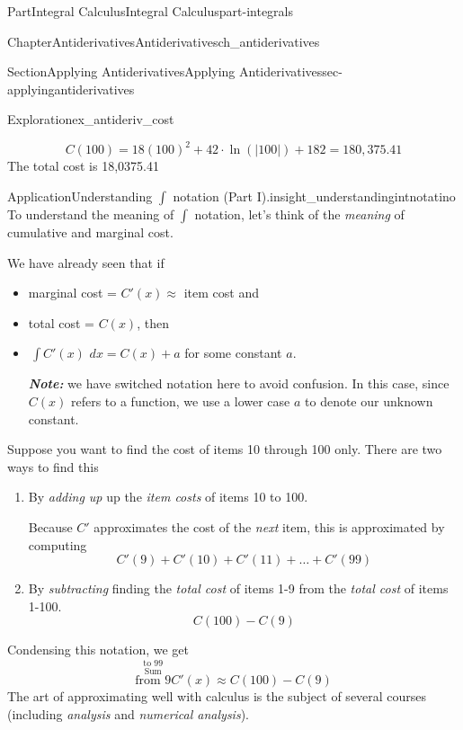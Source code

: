 \documentclass{tufte-book}
\newcommand{\alert}[1]{\textbf{\textit{#1}}}
\numberwithin{equation}{chapter}
\newcommand{\intdx}[1]{{\,\int#1\,\,dx}}
\begin{document}
\begin{partptx}{Part}{Integral Calculus}{}{Integral Calculus}{}{}{part-integrals}
\begin{chapterptx}{Chapter}{Antiderivatives}{}{Antiderivatives}{}{}{ch_antiderivatives}
\begin{sectionptx}{Section}{Applying Antiderivatives}{}{Applying Antiderivatives}{}{}{sec-applyingantiderivatives}
\begin{exploration}{Exploration}{}{ex_antideriv_cost}
\begin{enumerate}[font=\bfseries,label=(\alph*),ref=\alph*]
\begin{equation*}
C(100) = 18 (100)^2 + 42\cdot \ln(|100|) + 182 = 180,375.41
\end{equation*}
The total cost is \textdollar{}18,0375.41%
\end{enumerate}%
\end{exploration}%
\begin{insight}{Application}{Understanding \(\int\) notation (Part I).}{insight_understandingintnotatino}%
To understand the meaning of \(\int\) notation, let's think of the \emph{meaning} of cumulative and marginal cost.%
\par
We have already seen that if%
\begin{itemize}[label=\textbullet]
\item{}marginal cost = \(C'(x) \approx\) item cost and%
\item{}total cost = \(C(x)\), then%
\item{}\(\intdx{C'(x)} = C(x) + a\) for some constant \(a\).%
\par
\alert{Note:} we have switched notation here to avoid confusion. In this case, since \(C(x)\) refers to a function, we use a lower case \(a\) to denote our unknown constant.%
\end{itemize}
%
\par
Suppose you want to find the cost of items 10 through 100 only.  There are two ways to find this%
\begin{enumerate}
\item{}By \emph{adding up} up the \emph{item costs} of items 10 to 100.%
\par
Because \(C'\) approximates the cost of the \emph{next} item, this is approximated by computing%
\begin{equation*}
C'(9)+C'(10)+C'(11) + \dots + C'(99) 
\end{equation*}
%
\item{}By \emph{subtracting} finding the \emph{total cost} of items 1-9 from the \emph{total cost} of items 1-100.%
\begin{equation*}
C(100) - C(9)
\end{equation*}
%
\end{enumerate}
Condensing this notation, we get%
\begin{equation*}
\stackrel{ \scriptstyle \text{to 99} }{ \stackrel{\textstyle\text{Sum}}{ \scriptstyle \text{from 9} }  } C'(x)
\approx
C(100) - C(9)
\end{equation*}
The art of approximating well with calculus is the subject of several courses (including \emph{analysis} and \emph{numerical analysis}).%

\end{insight}
\end{sectionptx}
\end{chapterptx}
\end{partptx}
\end{document}
